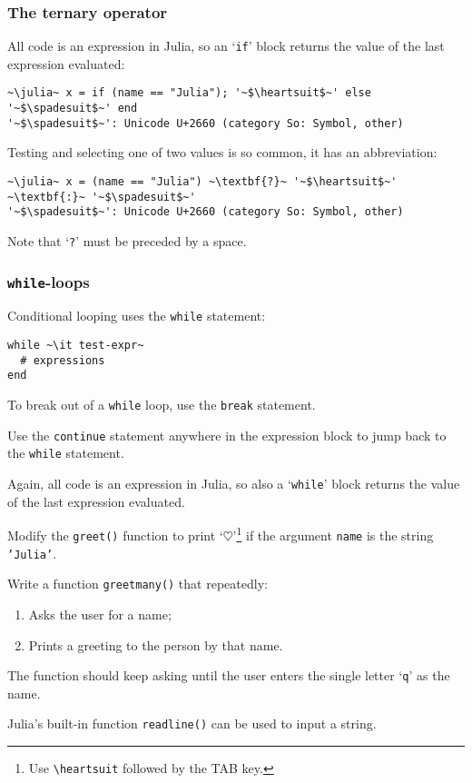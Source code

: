 \documentclass[english,serif,mathserif,xcolor=pdftex,dvipsnames,table]{beamer}
\begin{document}
\begin{frame}[fragile]
  \frametitle{The ternary operator}
  All code is an expression in Julia, so an `\texttt{if}' block
  returns the value of the last expression evaluated:
\begin{lstlisting}
~\julia~ x = if (name == "Julia"); '~$\heartsuit$~' else '~$\spadesuit$~' end
'~$\spadesuit$~': Unicode U+2660 (category So: Symbol, other)
\end{lstlisting}

  \+ Testing and selecting one of two values is so common, it has an
  abbreviation:
\begin{lstlisting}
~\julia~ x = (name == "Julia") ~\textbf{?}~ '~$\heartsuit$~' ~\textbf{:}~ '~$\spadesuit$~'
'~$\spadesuit$~': Unicode U+2660 (category So: Symbol, other)
\end{lstlisting}
  Note that `\texttt{?}' must be preceded by a space.
\end{frame}


\begin{frame}[fragile]
  \frametitle{\texttt{while}-loops}
  Conditional looping uses the \texttt{while} statement:
\begin{lstlisting}
while ~\it test-expr~
  # expressions
end
\end{lstlisting}

  \+
  To break out of a \texttt{while} loop, use the \texttt{break}
  statement.

  \+
  Use the \texttt{continue} statement anywhere in the expression
  block to jump back to the \texttt{while} statement.

  \+ Again, all code is an expression in Julia, so also a
  `\texttt{while}' block returns the value of the last expression
  evaluated.
\end{frame}


\begin{frame}
  \begin{exercise*}[2.B]
    Modify the \texttt{greet()} function to print `$\heartsuit$'{}\footnote{Use
      \texttt{{\textbackslash}heartsuit} followed by the TAB key.} if
    the argument \texttt{name} is the string \texttt{'Julia'}.
  \end{exercise*}

  \+
  \begin{exercise*}[2.C]
    Write a function \texttt{greetmany()} that repeatedly:
    \begin{enumerate}
    \item     Asks the user for a name;
    \item     Prints a greeting to the person by that name.
    \end{enumerate}

    The function should keep asking until the user enters the single
    letter `\texttt{q}' as the name.

    Julia's built-in function \texttt{readline()} can be used to input a string.
  \end{exercise*}
\end{frame}
\end{document}
